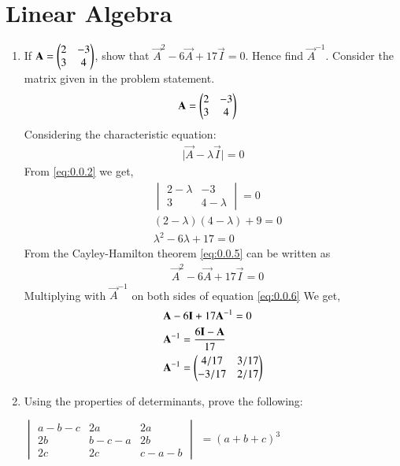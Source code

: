 \documentclass[journal,12pt,twocolumn]{IEEEtran}
\renewcommand\thesection{\arabic{section}}
\begin{document}
\section{Linear Algebra}
\renewcommand{\theequation}{\theenumi}
\begin{enumerate}[label=\thesection.\arabic*.,ref=\thesection.\theenumi]
\item
If $\mathbf{A} = \begin{pmatrix}2&-3\\3&4\end{pmatrix}$, show that $ \vec{A}^2-6\vec{A}+17\vec{I}=0$. Hence find $\vec{A}^{-1}$. 
\solution Consider the matrix  given in the problem statement.
\begin{align}
&\mathbf{A} = \begin{pmatrix}2&-3\\3&4\end{pmatrix}&
\end{align}
Considering the characteristic equation:  
\begin{align} 
& \vert\vec{A}-\lambda\vec{I}\vert = 0  & \label{eq:0.0.2}
\end{align}
From \eqref{eq:0.0.2} we get,
\begin{align}
&\begin{vmatrix}
  2-\lambda & -3\\ 3& 4-\lambda 
\end{vmatrix}
=0 \\
&(2-\lambda)(4-\lambda)+9=0\\ 
&\lambda^2-6\lambda+17=0 \label{eq:0.0.5} 
\end{align}
From the Cayley-Hamilton theorem \eqref{eq:0.0.5} can be written as
\begin{align}
&\vec{A}^2-6\vec{A}+17\vec{I} = 0  \label{eq:0.0.6} 
\end{align} 
Multiplying with $\vec{A}^{-1}$ on both sides of equation \eqref{eq:0.0.6}
We get,
\begin{align}
  &\mathbf{A}-6\mathbf{I}+17\mathbf{A}^{-1} = 0  \\
  &\mathbf{A}^{-1} = \displaystyle\frac{6\mathbf{I}-\mathbf{A}}{17} \\
  &\mathbf{A}^{-1} =  \begin{pmatrix}4/17 &  3/17 \\ -3/17 & 2/17 \end{pmatrix}
\end{align}
\item Using the properties of determinants, prove the following:
\begin{center}
$\begin{vmatrix}
a-b-c & 2a& 2a\\ 2b& b-c-a& 2b\\2c&2c&c-a-b 
\end{vmatrix}$
$= (a+b+c)^3$
\end{center}

\end{enumerate}
\end{document}
